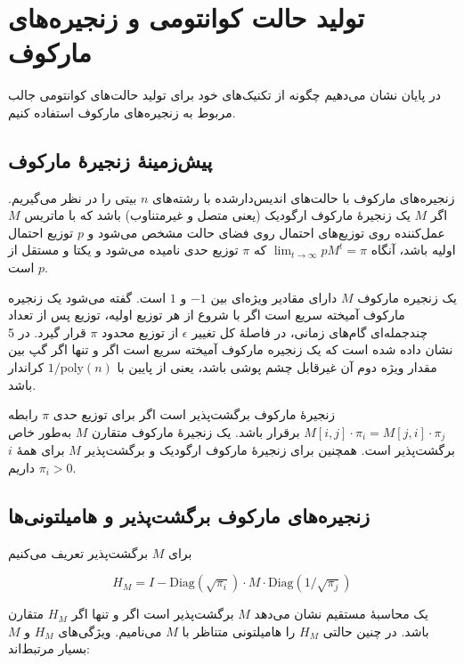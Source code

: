 \section{ تولید حالت کوانتومی و زنجیره‌های مارکوف}
در پایان نشان می‌دهیم چگونه از تکنیک‌های خود برای تولید حالت‌های کوانتومی جالب مربوط به زنجیره‌های مارکوف استفاده کنیم.
\subsection{ پیش‌زمینهٔ زنجیرهٔ مارکوف}

زنجیره‌های مارکوف با حالت‌های اندیس‌دارشده با رشته‌های $n$ بیتی را در نظر می‌گیریم. اگر $M$ یک زنجیرهٔ مارکوف ارگودیک (یعنی متصل و غیرمتناوب) باشد که با ماتریس $M$ عمل‌کننده روی توزیع‌های احتمال روی فضای حالت مشخص می‌شود و $p$ توزیع احتمال اولیه باشد، آنگاه $\lim_{t \to \infty} p M^t = \pi$ که $\pi$ توزیع حدی نامیده می‌شود و یکتا و مستقل از $p$ است.

یک زنجیره مارکوف $M$ دارای مقادیر ویژه‌ای بین $-1$ و $1$ است. گفته می‌شود یک زنجیره مارکوف آمیخته سریع  است اگر با شروع از هر توزیع اولیه، توزیع پس از تعداد چندجمله‌ای گام‌های زمانی، در فاصلهٔ کل تغییر $\epsilon$ از توزیع محدود $\pi$ قرار گیرد.  
در {5} نشان داده شده است که یک زنجیره مارکوف آمیخته سریع است اگر و تنها اگر گپ بین مقدار ویژه دوم آن غیرقابل چشم پوشی باشد، یعنی از پایین با $1/\text{poly}(n)$ کراندار باشد.
 
 زنجیرهٔ مارکوف برگشت‌پذیر است اگر برای توزیع حدی $\pi$ رابطه $M[i,j] \cdot \pi_i = M[j,i] \cdot \pi_j$ برقرار باشد. یک زنجیرهٔ مارکوف متقارن $M$ به‌طور خاص برگشت‌پذیر است. همچنین برای زنجیرهٔ مارکوف ارگودیک و برگشت‌پذیر $M$ برای همهٔ $i$ داریم $\pi_i > 0$.

\subsection{ زنجیره‌های مارکوف برگشت‌پذیر و هامیلتونی‌ها}
برای $M$ برگشت‌پذیر تعریف می‌کنیم

\begin{equation}
	H_M = I - \mathrm{Diag}(\sqrt{\pi_i}) \cdot M \cdot \mathrm{Diag}(1/\sqrt{\pi_j})
\end{equation}

یک محاسبهٔ مستقیم نشان می‌دهد $M$ برگشت‌پذیر است اگر و تنها اگر $H_M$ متقارن باشد. در چنین حالتی $H_M$ را هامیلتونی متناظر با $M$ می‌نامیم. ویژگی‌های $H_M$ و $M$ بسیار مرتبط‌اند: 


